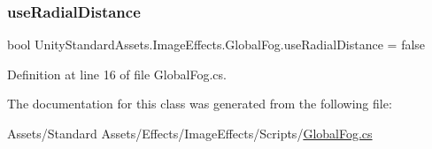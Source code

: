 \subsubsection{\texorpdfstring{use\+Radial\+Distance}{useRadialDistance}}
{\footnotesize\ttfamily bool Unity\+Standard\+Assets.\+Image\+Effects.\+Global\+Fog.\+use\+Radial\+Distance = false}



Definition at line 16 of file Global\+Fog.\+cs.



The documentation for this class was generated from the following file\+:\begin{DoxyCompactItemize}
\item 
Assets/\+Standard Assets/\+Effects/\+Image\+Effects/\+Scripts/\mbox{\hyperlink{_global_fog_8cs}{Global\+Fog.\+cs}}\end{DoxyCompactItemize}
